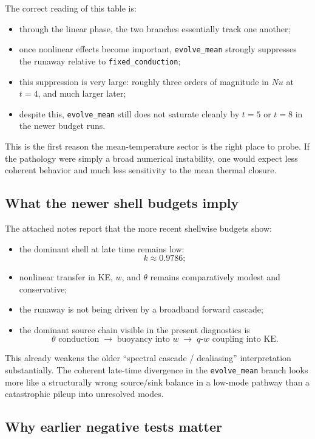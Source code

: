 \documentclass[11pt]{article}
\begin{document}
The correct reading of this table is:

\begin{itemize}
\item through the linear phase, the two branches essentially track one another;
\item once nonlinear effects become important, \texttt{evolve\_mean} strongly suppresses the runaway relative to \texttt{fixed\_conduction};
\item this suppression is very large: roughly three orders of magnitude in $Nu$ at $t=4$, and much larger later;
\item despite this, \texttt{evolve\_mean} still does not saturate cleanly by $t=5$ or $t=8$ in the newer budget runs.
\end{itemize}

This is the first reason the mean-temperature sector is the right place to probe. If the pathology were simply a broad numerical instability, one would expect less coherent behavior and much less sensitivity to the mean thermal closure.

\subsection{What the newer shell budgets imply}

The attached notes report that the more recent shellwise budgets show:

\begin{itemize}
\item the dominant shell at late time remains low:
\[
k \approx 0.9786;
\]
\item nonlinear transfer in KE, $w$, and $\theta$ remains comparatively modest and conservative;
\item the runaway is not being driven by a broadband forward cascade;
\item the dominant source chain visible in the present diagnostics is
\[
\theta\text{ conduction} \;\longrightarrow\; \text{buoyancy into } w \;\longrightarrow\; q\text{-}w\text{ coupling into KE}.
\]
\end{itemize}

This already weakens the older ``spectral cascade / dealiasing'' interpretation substantially. The coherent late-time divergence in the \texttt{evolve\_mean} branch looks more like a structurally wrong source/sink balance in a low-mode pathway than a catastrophic pileup into unresolved modes.

\subsection{Why earlier negative tests matter}
\end{document}
